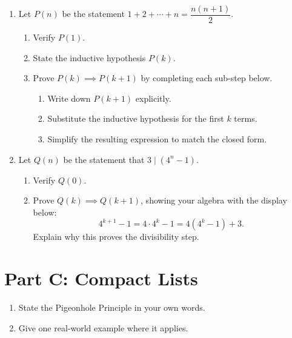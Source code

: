 \documentclass[12pt]{article}
\begin{document}
\begin{enumerate}
  \item Let $P(n)$ be the statement $1 + 2 + \cdots + n = \dfrac{n(n+1)}{2}$.
  \begin{enumerate}[label=(\alph*)]
    \item Verify $P(1)$.

    \vspace{0.5cm}

    \item State the inductive hypothesis $P(k)$.

    \vspace{0.5cm}

    \item Prove $P(k) \implies P(k+1)$ by completing each sub-step below.
    \begin{enumerate}[label=\roman*.,itemsep=0pt]
      \item Write down $P(k+1)$ explicitly.
      \item Substitute the inductive hypothesis for the first $k$ terms.
      \item Simplify the resulting expression to match the closed form.
    \end{enumerate}

    \vspace{1cm}
    \hrulefill
  \end{enumerate}

  \item Let $Q(n)$ be the statement that $3 \mid (4^n - 1)$.
  \begin{enumerate}[label=(\alph*)]
    \item Verify $Q(0)$.
    \item Prove $Q(k) \implies Q(k+1)$, showing your algebra with the
          display below:
          \[
            4^{k+1} - 1 = 4 \cdot 4^k - 1 = 4(4^k - 1) + 3.
          \]
          Explain why this proves the divisibility step.

    \vspace{1cm}
    \hrulefill
  \end{enumerate}
\end{enumerate}

\section*{Part C: Compact Lists}

\begin{enumerate}[leftmargin=*]
  \item State the Pigeonhole Principle in your own words.
  \item Give one real-world example where it applies.
\end{enumerate}
\end{document}
